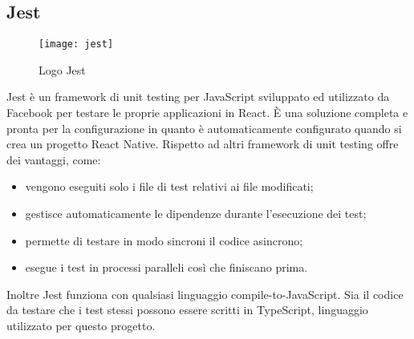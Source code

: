 \subsection{Jest}
\begin{figure}[H] 
	\centering
	\texttt{[image: jest]}
	\caption{Logo Jest}
\end{figure}
Jest è un framework di unit testing per JavaScript sviluppato ed utilizzato da Facebook per testare le proprie applicazioni in React. È una soluzione completa e pronta per la configurazione in quanto è automaticamente configurato quando si crea un progetto React Native.
Rispetto ad altri framework di unit testing offre dei vantaggi, come: 
\begin{itemize}
	\item vengono eseguiti solo i file di test relativi ai file modificati;
	\item gestisce automaticamente le dipendenze durante l'esecuzione dei test;
	\item permette di testare in modo sincroni il codice asincrono;
	\item esegue i test in processi paralleli così che finiscano prima.
\end{itemize}
Inoltre Jest funziona con qualsiasi linguaggio compile-to-JavaScript. Sia il codice da testare che i test stessi possono essere scritti in TypeScript, linguaggio utilizzato per questo progetto. 
